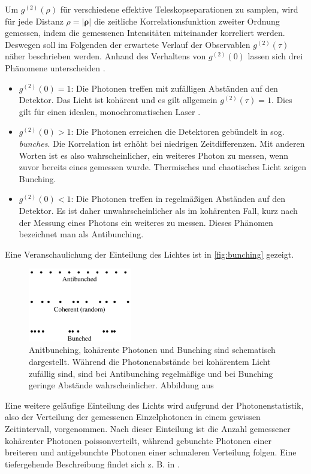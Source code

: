 Um $g^{(2)}(\rho)$ für verschiedene effektive Teleskopseparationen zu samplen, wird für jede Distanz $\rho=|\bm{\rho}|$ die zeitliche Korrelationsfunktion zweiter Ordnung gemessen, indem die gemessenen Intensitäten miteinander korreliert werden. 
Deswegen soll im Folgenden der erwartete Verlauf der Observablen $g^{(2)}(\tau)$ näher beschrieben werden. 
Anhand des Verhaltens von $g^{(2)}(0)$ lassen sich drei Phänomene unterscheiden \cite{foxQuantumOpticsIntroduction2006}. 
\begin{itemize}
    \item $g^{(2)}(0)=1$: Die Photonen treffen mit zufälligen Abständen auf den Detektor. Das Licht ist kohärent und es gilt allgemein $g^{(2)}(\tau)=1$. Dies gilt für einen idealen, monochromatischen Laser \cite[Kap. 9]{mansuripurClassicalOpticsIts2009}.
    \item $g^{(2)}(0)>1$: Die Photonen erreichen die Detektoren gebündelt in sog. \emph{bunches}. Die Korrelation ist erhöht bei niedrigen Zeitdifferenzen. Mit anderen Worten ist es also wahrscheinlicher, ein weiteres Photon zu messen, wenn zuvor bereits eines gemessen wurde. Thermisches und chaotisches Licht zeigen Bunching.
    \item $g^{(2)}(0)<1$: Die Photonen treffen in regelmäßigen Abständen auf den Detektor. Es ist daher unwahrscheinlicher als im kohärenten Fall, kurz nach der Messung eines Photons ein weiteres zu messen. Dieses Phänomen bezeichnet man als Antibunching. 
\end{itemize}
Eine Veranschaulichung der Einteilung des Lichtes ist in \autoref{fig:bunching} gezeigt. 
\begin{figure}[h]
    \centering
    \includegraphics[width=0.4\textwidth]{images/Theorie/Fox_6.6.png}
    \caption{Anitbunching, kohärente Photonen und Bunching sind schematisch dargestellt. Während die Photonenabstände bei kohärentem Licht zufällig sind, sind bei Antibunching regelmäßige und bei Bunching geringe Abstände wahrscheinlicher. Abbildung aus \cite[Fig. 6.6]{foxQuantumOpticsIntroduction2006}}
    \label{fig:bunching}
\end{figure}
Eine weitere geläufige Einteilung des Lichts wird aufgrund der Photonenstatistik, also der Verteilung der gemessenen Einzelphotonen in einem gewissen Zeitintervall, vorgenommen. 
Nach dieser Einteilung ist die Anzahl gemessener kohärenter Photonen poissonverteilt, während gebunchte Photonen einer breiteren und antigebunchte Photonen einer schmaleren Verteilung folgen. 
Eine tiefergehende Beschreibung findet sich z. B. in \cite[Kap. 5.4-5.6]{foxQuantumOpticsIntroduction2006}. \\

